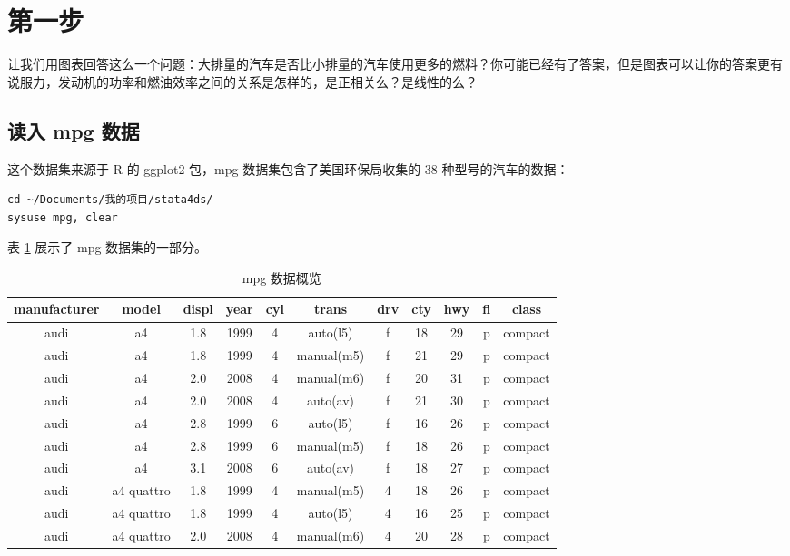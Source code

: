 \documentclass[]{ctexbook}
\begin{document}
\hypertarget{section-28}{%
\section{第一步}\label{section-28}}

让我们用图表回答这么一个问题：大排量的汽车是否比小排量的汽车使用更多的燃料？你可能已经有了答案，但是图表可以让你的答案更有说服力，发动机的功率和燃油效率之间的关系是怎样的，是正相关么？是线性的么？

\hypertarget{mpg-}{%
\subsection{读入 mpg 数据}\label{mpg-}}

这个数据集来源于 R 的 ggplot2 包，mpg 数据集包含了美国环保局收集的 38 种型号的汽车的数据：

\begin{lstlisting}
cd ~/Documents/我的项目/stata4ds/
sysuse mpg, clear
\end{lstlisting}

表 \ref{tab:mpg} 展示了 mpg 数据集的一部分。

\begin{table}[t]

\caption{\label{tab:mpg}mpg 数据概览}
\centering
\begin{tabular}{ccccccccccc}
\toprule
manufacturer & model & displ & year & cyl & trans & drv & cty & hwy & fl & class\\
\midrule
audi & a4 & 1.8 & 1999 & 4 & auto(l5) & f & 18 & 29 & p & compact\\
audi & a4 & 1.8 & 1999 & 4 & manual(m5) & f & 21 & 29 & p & compact\\
audi & a4 & 2.0 & 2008 & 4 & manual(m6) & f & 20 & 31 & p & compact\\
audi & a4 & 2.0 & 2008 & 4 & auto(av) & f & 21 & 30 & p & compact\\
audi & a4 & 2.8 & 1999 & 6 & auto(l5) & f & 16 & 26 & p & compact\\
\addlinespace
audi & a4 & 2.8 & 1999 & 6 & manual(m5) & f & 18 & 26 & p & compact\\
audi & a4 & 3.1 & 2008 & 6 & auto(av) & f & 18 & 27 & p & compact\\
audi & a4 quattro & 1.8 & 1999 & 4 & manual(m5) & 4 & 18 & 26 & p & compact\\
audi & a4 quattro & 1.8 & 1999 & 4 & auto(l5) & 4 & 16 & 25 & p & compact\\
audi & a4 quattro & 2.0 & 2008 & 4 & manual(m6) & 4 & 20 & 28 & p & compact\\
\bottomrule
\end{tabular}
\end{table}
\end{document}
